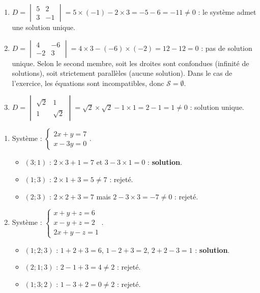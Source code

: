 \documentclass[11pt]{article}
\begin{document}
\begin{corrige}
\begin{enumerate}
\item $D = \begin{vmatrix} 5 & 2 \\ 3 & -1 \end{vmatrix} = 5\times(-1) - 2\times 3 = -5 - 6 = -11 \neq 0$ : le système admet une solution unique.
\item $D = \begin{vmatrix} 4 & -6 \\ -2 & 3 \end{vmatrix} = 4\times 3 - (-6)\times(-2) = 12 - 12 = 0$ : pas de solution unique. Selon le second membre, soit les droites sont confondues (infinité de solutions), soit strictement parallèles (aucune solution). Dans le cas de l'exercice, les équations sont incompatibles, donc $\mathcal{S} = \emptyset$.
\item $D = \begin{vmatrix} \sqrt{2} & 1 \\ 1 & \sqrt{2} \end{vmatrix} = \sqrt{2}\times\sqrt{2} - 1\times 1 = 2 - 1 = 1 \neq 0$ : solution unique.
\end{enumerate}
\end{corrige}

\begin{corrige}
\begin{enumerate}
\item Système : $\begin{cases} 2x + y = 7 \\ x - 3y = 0 \end{cases}$.
\begin{itemize}
\item $(3 ; 1)$ : $2\times 3 + 1 = 7$ et $3 - 3\times 1 = 0$ : \textbf{solution}.
\item $(1 ; 3)$ : $2\times 1 + 3 = 5 \neq 7$ : rejeté.
\item $(2 ; 3)$ : $2\times 2 + 3 = 7$ mais $2 - 3\times 3 = -7 \neq 0$ : rejeté.
\end{itemize}
\item Système : $\begin{cases} x + y + z = 6 \\ x - y + z = 2 \\ 2x + y - z = 1 \end{cases}$.
\begin{itemize}
\item $(1 ; 2 ; 3)$ : $1+2+3=6$, $1-2+3=2$, $2+2-3=1$ : \textbf{solution}.
\item $(2 ; 1 ; 3)$ : $2-1+3=4 \neq 2$ : rejeté.
\item $(1 ; 3 ; 2)$ : $1-3+2=0 \neq 2$ : rejeté.
\end{itemize}
\end{enumerate}
\end{corrige}
\end{document}
